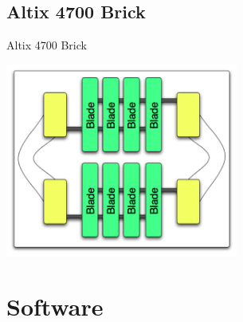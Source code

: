 \documentclass{beamer}
\begin{document}
  \subsection{Altix 4700 Brick}
  \begin{frame}{Altix 4700 Brick}
   \begin{center}\includegraphics[height=2.5in]{bighouseBrick}\end{center}
  \end{frame}

\section{Software}
\end{document}
